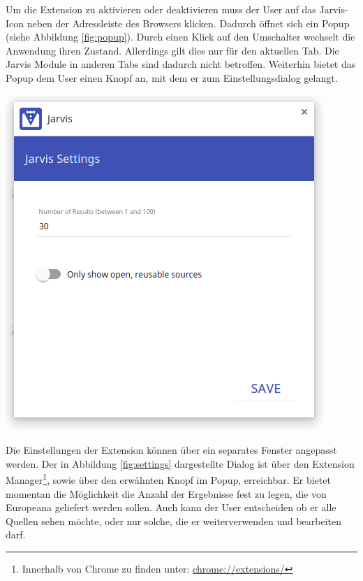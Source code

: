  Um die Extension zu aktivieren oder deaktivieren muss der User auf das Jarvis-Icon neben der Adressleiste des Browsers klicken. Dadurch öffnet sich ein Popup (siehe Abbildung \ref{fig:popup}). Durch einen Klick auf den Umschalter wechselt die Anwendung ihren Zustand. Allerdings gilt dies nur für den aktuellen Tab. Die Jarvis Module in anderen Tabs sind dadurch nicht betroffen. Weiterhin bietet das Popup dem User einen Knopf an, mit dem er zum Einstellungsdialog gelangt.

 \begin{minipage}{\linewidth}
	\centering
	\vspace*{0.5cm}
	\includegraphics[scale=0.5]{Bilder/app-screenshots/settings.png}
	\label{fig:settings}
	\vspace*{0.5cm}
 \end{minipage}

 Die Einstellungen der Extension können über ein separates Fenster angepasst werden. Der in Abbildung \ref{fig:settings} dargestellte Dialog ist über den Extension Manager\footnote{Innerhalb von Chrome zu finden unter: \url{chrome://extensions/}}, sowie über den erwähnten Knopf im Popup, erreichbar. Er bietet momentan die Möglichkeit die Anzahl der Ergebnisse fest zu legen, die von Europeana geliefert werden sollen. Auch kann der User entscheiden ob er alle Quellen sehen möchte, oder nur solche, die er weiterverwenden und bearbeiten darf.